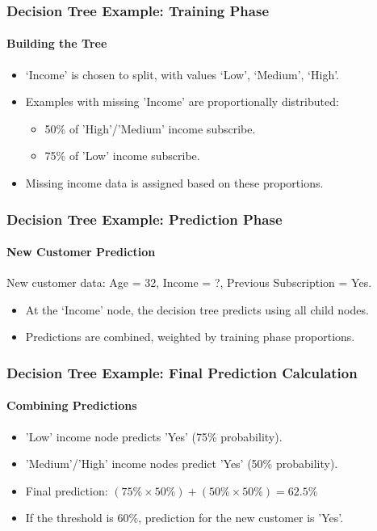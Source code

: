 \documentclass[9pt,dvipsnames]{beamer}
\begin{document}
	\begin{frame}
		\frametitle{Decision Tree Example: Training Phase}
		\framesubtitle{Building the Tree}
		
		\begin{itemize}
			\item `Income' is chosen to split, with values `Low', `Medium', `High'.
			\item Examples with missing 'Income' are proportionally distributed:
			\begin{itemize}
				\item 50\% of 'High'/'Medium' income subscribe.
				\item 75\% of 'Low' income subscribe.
			\end{itemize}
			\item Missing income data is assigned based on these proportions.
		\end{itemize}
	\end{frame}
	\begin{frame}
		\frametitle{Decision Tree Example: Prediction Phase}
		\framesubtitle{New Customer Prediction}
		
		New customer data: Age = 32, Income = ?, Previous Subscription = Yes.
		
		\begin{itemize}
			\item At the `Income' node, the decision tree predicts using all child nodes.
			\item Predictions are combined, weighted by training phase proportions.
		\end{itemize}
	\end{frame}
	\begin{frame}
		\frametitle{Decision Tree Example: Final Prediction Calculation}
		\framesubtitle{Combining Predictions}
		
		\begin{itemize}
			\item 'Low' income node predicts 'Yes' (75\% probability).
			\item 'Medium'/'High' income nodes predict 'Yes' (50\% probability).
			\item Final prediction: \( (75\% \times 50\%) + (50\% \times 50\%) = 62.5\% \)
			\item If the threshold is 60\%, prediction for the new customer is 'Yes'.
		\end{itemize}
	\end{frame}
	
\end{document}
